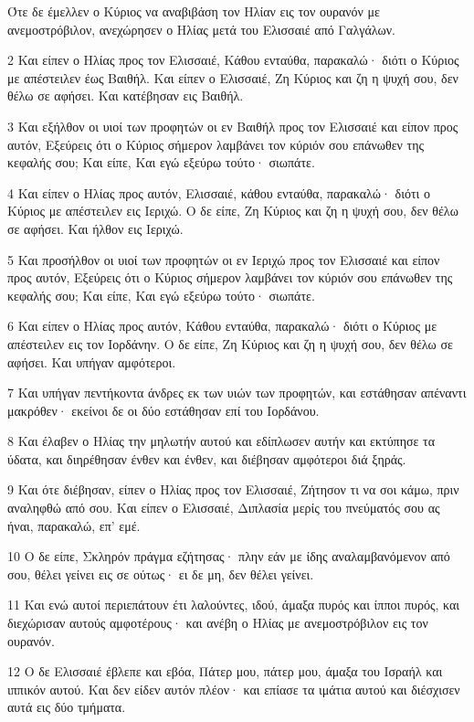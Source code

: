 \par Ότε δε έμελλεν ο Κύριος να αναβιβάση τον Ηλίαν εις τον ουρανόν με ανεμοστρόβιλον, ανεχώρησεν ο Ηλίας μετά του Ελισσαιέ από Γαλγάλων.
\par 2 Και είπεν ο Ηλίας προς τον Ελισσαιέ, Κάθου ενταύθα, παρακαλώ· διότι ο Κύριος με απέστειλεν έως Βαιθήλ. Και είπεν ο Ελισσαιέ, Ζη Κύριος και ζη η ψυχή σου, δεν θέλω σε αφήσει. Και κατέβησαν εις Βαιθήλ.
\par 3 Και εξήλθον οι υιοί των προφητών οι εν Βαιθήλ προς τον Ελισσαιέ και είπον προς αυτόν, Εξεύρεις ότι ο Κύριος σήμερον λαμβάνει τον κύριόν σου επάνωθεν της κεφαλής σου; Και είπε, Και εγώ εξεύρω τούτο· σιωπάτε.
\par 4 Και είπεν ο Ηλίας προς αυτόν, Ελισσαιέ, κάθου ενταύθα, παρακαλώ· διότι ο Κύριος με απέστειλεν εις Ιεριχώ. Ο δε είπε, Ζη Κύριος και ζη η ψυχή σου, δεν θέλω σε αφήσει. Και ήλθον εις Ιεριχώ.
\par 5 Και προσήλθον οι υιοί των προφητών οι εν Ιεριχώ προς τον Ελισσαιέ και είπον προς αυτόν, Εξεύρεις ότι ο Κύριος σήμερον λαμβάνει τον κύριόν σου επάνωθεν της κεφαλής σου; Και είπε, Και εγώ εξεύρω τούτο· σιωπάτε.
\par 6 Και είπεν ο Ηλίας προς αυτόν, Κάθου ενταύθα, παρακαλώ· διότι ο Κύριος με απέστειλεν εις τον Ιορδάνην. Ο δε είπε, Ζη Κύριος και ζη η ψυχή σου, δεν θέλω σε αφήσει. Και υπήγαν αμφότεροι.
\par 7 Και υπήγαν πεντήκοντα άνδρες εκ των υιών των προφητών, και εστάθησαν απέναντι μακρόθεν· εκείνοι δε οι δύο εστάθησαν επί του Ιορδάνου.
\par 8 Και έλαβεν ο Ηλίας την μηλωτήν αυτού και εδίπλωσεν αυτήν και εκτύπησε τα ύδατα, και διηρέθησαν ένθεν και ένθεν, και διέβησαν αμφότεροι διά ξηράς.
\par 9 Και ότε διέβησαν, είπεν ο Ηλίας προς τον Ελισσαιέ, Ζήτησον τι να σοι κάμω, πριν αναληφθώ από σου. Και είπεν ο Ελισσαιέ, Διπλασία μερίς του πνεύματός σου ας ήναι, παρακαλώ, επ' εμέ.
\par 10 Ο δε είπε, Σκληρόν πράγμα εζήτησας· πλην εάν με ίδης αναλαμβανόμενον από σου, θέλει γείνει εις σε ούτως· ει δε μη, δεν θέλει γείνει.
\par 11 Και ενώ αυτοί περιεπάτουν έτι λαλούντες, ιδού, άμαξα πυρός και ίπποι πυρός, και διεχώρισαν αυτούς αμφοτέρους· και ανέβη ο Ηλίας με ανεμοστρόβιλον εις τον ουρανόν.
\par 12 Ο δε Ελισσαιέ έβλεπε και εβόα, Πάτερ μου, πάτερ μου, άμαξα του Ισραήλ και ιππικόν αυτού. Και δεν είδεν αυτόν πλέον· και επίασε τα ιμάτια αυτού και διέσχισεν αυτά εις δύο τμήματα.
